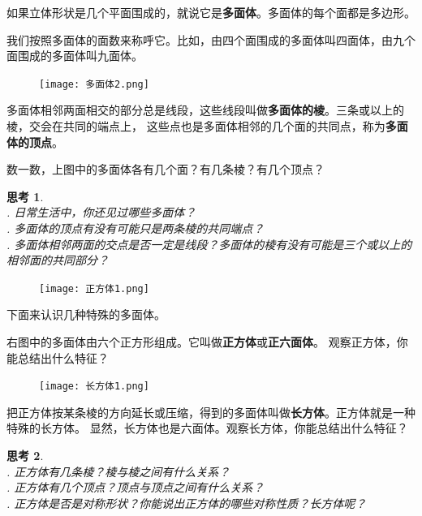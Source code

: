 \documentclass[12pt,UTF8]{ctexbook}
\newtheorem{sk}{思考}[section]
\begin{document}
如果立体形状是几个平面围成的，就说它是\textbf{多面体}。多面体的每个面都是多边形。

我们按照多面体的面数来称呼它。比如，由四个面围成的多面体叫四面体，由九个面围成的多面体叫九面体。

\begin{figure}[h] %
    \vspace{4pt}
    \centering
    \texttt{[image: 多面体2.png]}
\end{figure}

多面体相邻两面相交的部分总是线段，这些线段叫做\textbf{多面体的棱}。三条或以上的棱，交会在共同的端点上，
这些点也是多面体相邻的几个面的共同点，称为\textbf{多面体的顶点}。

数一数，上图中的多面体各有几个面？有几条棱？有几个顶点？

\begin{sk}
    \mbox{}\\
    . 日常生活中，你还见过哪些多面体？\\
    . 多面体的顶点有没有可能只是两条棱的共同端点？\\
    . 多面体相邻两面的交点是否一定是线段？多面体的棱有没有可能是三个或以上的相邻面的共同部分？    
\end{sk}

\begin{figure} %
    \vspace{-50pt}
    \flushright
    \texttt{[image: 正方体1.png]}
\end{figure}

下面来认识几种特殊的多面体。

右图中的多面体由六个正方形组成。它叫做\textbf{正方体}或\textbf{正六面体}。
观察正方体，你能总结出什么特征？

\begin{figure} %
    \vspace{-20pt}
    \flushright
    \texttt{[image: 长方体1.png]}
\end{figure}

把正方体按某条棱的方向延长或压缩，得到的多面体叫做\textbf{长方体}。正方体就是一种特殊的长方体。
显然，长方体也是六面体。观察长方体，你能总结出什么特征？

\begin{sk}
    \mbox{}\\
    . 正方体有几条棱？棱与棱之间有什么关系？\\
    . 正方体有几个顶点？顶点与顶点之间有什么关系？\\
    . 正方体是否是对称形状？你能说出正方体的哪些对称性质？长方体呢？
\end{sk}
\end{document}
